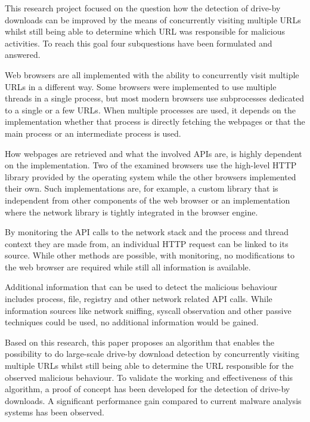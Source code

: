 This research project focused on the question how the detection of drive-by downloads can be improved by the means of concurrently visiting multiple URLs whilst still being able to determine which URL was responsible for malicious activities. To reach this goal four subquestions have been formulated and answered.

Web browsers are all implemented with the ability to concurrently visit multiple URLs in a different way. Some browsers were implemented to use multiple threads in a single process, but most modern browsers use subprocesses dedicated to a single or a few URLs. When multiple processes are used, it depends on the implementation whether that process is directly fetching the webpages or that the main process or an intermediate process is used.

How webpages are retrieved and what the involved APIs are, is highly dependent on the implementation. Two of the examined browsers use the high-level HTTP library provided by the operating system while the other browsers implemented their own. Such implementations are, for example, a custom library that is independent from other components of the web browser or an implementation where the network library is tightly integrated in the browser engine.

By monitoring the API calls to the network stack and the process and thread context they are made from, an individual HTTP request can be linked to its source. While other methods are possible, with monitoring, no modifications to the web browser are required while still all information is available.

Additional information that can be used to detect the malicious behaviour includes process, file, registry and other network related API calls. While information sources like network sniffing, syscall observation and other passive techniques could be used, no additional information would be gained.

Based on this research, this paper proposes an algorithm that enables the possibility to do large-scale drive-by download detection by concurrently visiting multiple URLs whilst still being able to determine the URL responsible for the observed malicious behaviour. To validate the working and effectiveness of this algorithm, a proof of concept has been developed for the detection of drive-by downloads. A significant performance gain compared to current malware analysis systems has been observed.
